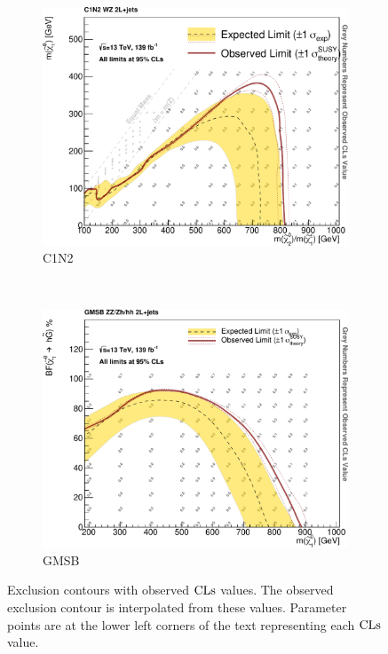 \begin{figure}[tp]
\centering
\begin{subfigure}{0.7\textwidth}
\centering
\includegraphics[width=\textwidth]{figures/2ljets_c1n2_Output_Contours_cls_obs.pdf}
\caption{C1N2}
\end{subfigure}
\\
\begin{subfigure}{0.7\textwidth}
\centering
\includegraphics[width=\textwidth]{figures/2ljets_gmsb_Output_Contours_cls_obs.pdf}
\caption{GMSB}
\end{subfigure}
\caption[
Exclusion contours with observed $\cls$ values
]{%
Exclusion contours with observed $\cls$ values.
The observed exclusion contour is interpolated from these values.
Parameter points are at the lower left corners of the text representing each
$\cls$ value.
}
\label{fig:2ljets_fit_contours_cls}
\end{figure}

